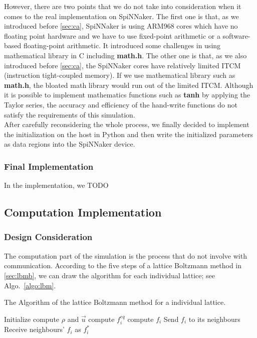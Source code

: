 However, there are two points that we do not take into consideration when it comes to the real implementation on SpiNNaker. The first one is that, as we introduced before \ref{sec:ca}, SpiNNaker is using ARM968 cores which have no floating point hardware and we have to use fixed-point arithmetic or a software-based floating-point arithmetic. It introduced some challenges in using mathematical library in C including \textbf{math.h}. The other one is that, as we also introduced before \ref{sec:ca}, the SpiNNaker cores have relatively limited ITCM (instruction tight-coupled memory). If we use mathematical library such as \textbf{math.h}, the bloated math library would run out of the limited ITCM. Although it is possible to implement mathematics functions such as \textbf{tanh} by applying the Taylor series, the accuracy and efficiency of the hand-write functions do not satisfy the requirements of this simulation.\\

After carefully reconsidering the whole process, we finally decided to implement the initialization on the host in Python and then write the initialized parameters as data regions into the SpiNNaker device. 
\subsubsection{Final Implementation}
In the implementation, we TODO


\subsection{Computation Implementation} \label{sec:cp}
\subsubsection{Design Consideration}
The computation part of the simulation is the process that do not involve with communication. According to the five steps of a lattice Boltzmann method in \ref{sec:lbmb}, we can draw the algorithm for each individual lattice; see Algo.~\ref{algo:lbm}.

\begin{algorithm}
 \caption{The Algorithm of the lattice Boltzmann method for a individual lattice.}
 \label{algo:lbm}
 Initialize\;
  {
  compute $\rho$ and $\vec u$\;
 compute $f_i^{eq}$\;
 compute $f_i$ \;  
 Send $f_i$ to its neighbours\;  
 Receive neighbours' $f_i$ as $f_i^{*}$\; 
 }
 
\end{algorithm}

